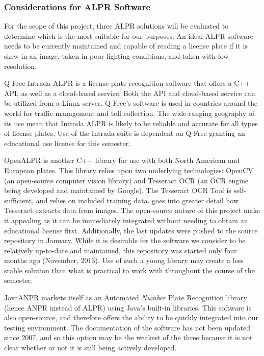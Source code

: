 \documentclass[11pt, oneside, fullpage, doublespace]{article}
\begin{document}
\subsubsection{Considerations for ALPR Software}
For the scope of this project, three ALPR solutions will be evaluated to determine which is the most suitable for our purposes. An ideal ALPR software needs to be currently maintained and capable of reading a license plate if it is skew in an image, taken in poor lighting conditions, and taken with low resolution.

Q-Free Intrada ALPR is a license plate recognition software that offers a C++ API, as well as a cloud-based service. Both the API and cloud-based service can be utilized from a Linux server. Q-Free's software is used in countries around the world for traffic management and toll collection. The wide-ranging geography of its use mean that Intrada ALPR is likely to be reliable and accurate for all types of license plates. Use of the Intrada suite is dependent on Q-Free granting an educational use license for this semester.

OpenALPR is another C++ library for use with both North American and European plates. This library relies upon two underlying technologies: OpenCV (an open-source computer vision library) and Tesseract OCR (an OCR engine being developed and maintained by Google). The Tesseract OCR Tool is self-sufficient, and relies on included training data. \cite{patel2012} goes into greater detail how Tesseract extracts data from images. The open-source nature of this project make it appealing as it can be immediately integrated without needing to obtain an educational license first. Additionally, the last updates were pushed to the source repository in January. While it is desirable for the software we consider to be relatively up-to-date and maintained, this repository was started only four months ago (November, 2013). Use of such a young library may create a less stable solution than what is practical to work with throughout the course of the semester.

JavaANPR markets itself as an Automated \emph{Number} Plate Recognition library (hence ANPR instead of ALPR) using Java's built-in libraries. This software is also open-source, and therefore offers the ability to be quickly integrated into our testing environment. The documentation of the software has not been updated since 2007, and so this option may be the weakest of the three because it is not clear whether or not it is still being actively developed.
\end{document}
